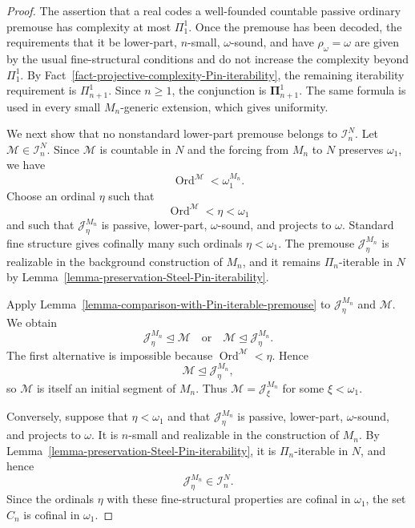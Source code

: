 \documentclass[a4paper,11pt]{article}
\begin{document}
\begin{proof}
The assertion that a real codes a well-founded countable passive ordinary
premouse has complexity at most $\Pi^1_1$.  Once the premouse has been
decoded, the requirements that it be lower-part, $n$-small,
$\omega$-sound, and have $\rho_\omega=\omega$ are given by the usual
fine-structural conditions and do not increase the complexity beyond
$\Pi^1_1$.  By
Fact~\ref{fact-projective-complexity-Pin-iterability}, the remaining
iterability requirement is $\Pi^1_{n+1}$.  Since $n\geq1$, the conjunction is
$\boldsymbol{\Pi}^1_{n+1}$.  The same formula is used in every small
$M_n$-generic extension, which gives uniformity.

We next show that no nonstandard lower-part premouse belongs to
$\mathcal I_n^N$.  Let $\mathcal M\in\mathcal I_n^N$.  Since $\mathcal M$ is
countable in $N$ and the forcing from $M_n$ to $N$ preserves $\omega_1$, we
have
\[
   \operatorname{Ord}^{\mathcal M}<\omega_1^{M_n}.
\]
Choose an ordinal $\eta$ such that
\[
   \operatorname{Ord}^{\mathcal M}<\eta<\omega_1
\]
and such that $\mathcal J^{M_n}_\eta$ is passive, lower-part,
$\omega$-sound, and projects to $\omega$.  Standard fine structure gives
cofinally many such ordinals $\eta<\omega_1$.  The premouse
$\mathcal J^{M_n}_\eta$ is realizable in the background construction of
$M_n$, and it remains $\Pi_n$-iterable in $N$ by
Lemma~\ref{lemma-preservation-Steel-Pin-iterability}.

Apply Lemma~\ref{lemma-comparison-with-Pin-iterable-premouse} to
$\mathcal J^{M_n}_\eta$ and $\mathcal M$.  We obtain
\[
   \mathcal J^{M_n}_\eta\trianglelefteq\mathcal M
   \quad\text{or}\quad
   \mathcal M\trianglelefteq\mathcal J^{M_n}_\eta.
\]
The first alternative is impossible because
$\operatorname{Ord}^{\mathcal M}<\eta$.  Hence
\[
   \mathcal M\trianglelefteq\mathcal J^{M_n}_\eta,
\]
so $\mathcal M$ is itself an initial segment of $M_n$.  Thus
$\mathcal M=\mathcal J^{M_n}_\xi$ for some $\xi<\omega_1$.

Conversely, suppose that $\eta<\omega_1$ and that
$\mathcal J^{M_n}_\eta$ is passive, lower-part, $\omega$-sound, and projects
to $\omega$.  It is $n$-small and realizable in the construction of $M_n$.
By Lemma~\ref{lemma-preservation-Steel-Pin-iterability}, it is
$\Pi_n$-iterable in $N$, and hence
\[
   \mathcal J^{M_n}_\eta\in\mathcal I_n^N.
\]
Since the ordinals $\eta$ with these fine-structural properties are cofinal in
$\omega_1$, the set $C_n$ is cofinal in $\omega_1$.
\end{proof}
\end{document}
